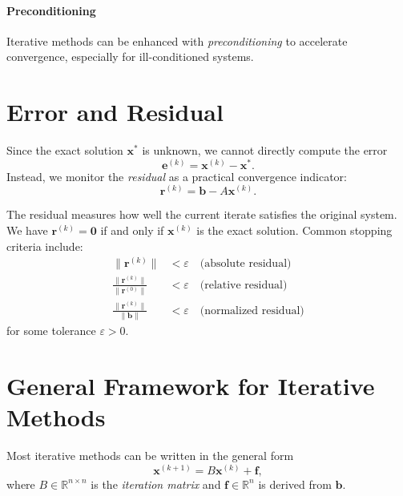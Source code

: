 \paragraph{Preconditioning}
Iterative methods can be enhanced with \emph{preconditioning} to accelerate convergence, especially for ill-conditioned systems.

\section{Error and Residual}

Since the exact solution $\mathbf{x}^*$ is unknown, we cannot directly compute the error
\begin{equation}
    \mathbf{e}^{(k)} = \mathbf{x}^{(k)} - \mathbf{x}^*.
\end{equation}
Instead, we monitor the \emph{residual} as a practical convergence indicator:
\begin{equation}
    \mathbf{r}^{(k)} = \mathbf{b} - A\mathbf{x}^{(k)}.
\end{equation}

The residual measures how well the current iterate satisfies the original system. We have $\mathbf{r}^{(k)} = \mathbf{0}$ if and only if $\mathbf{x}^{(k)}$ is the exact solution. Common stopping criteria include:
\begin{align}
    \|\mathbf{r}^{(k)}\| &< \varepsilon \quad \text{(absolute residual)} \\
    \frac{\|\mathbf{r}^{(k)}\|}{\|\mathbf{r}^{(0)}\|} &< \varepsilon \quad \text{(relative residual)} \\
    \frac{\|\mathbf{r}^{(k)}\|}{\|\mathbf{b}\|} &< \varepsilon \quad \text{(normalized residual)}
\end{align}
for some tolerance $\varepsilon > 0$.

\section{General Framework for Iterative Methods}
\label{sec:iterative-framework}

Most iterative methods can be written in the general form
\begin{equation}
    \mathbf{x}^{(k+1)} = B\mathbf{x}^{(k)} + \mathbf{f},
    \label{eq:general-iteration}
\end{equation}
where $B \in \mathbb{R}^{n \times n}$ is the \emph{iteration matrix} and $\mathbf{f} \in \mathbb{R}^n$ is derived from $\mathbf{b}$.

